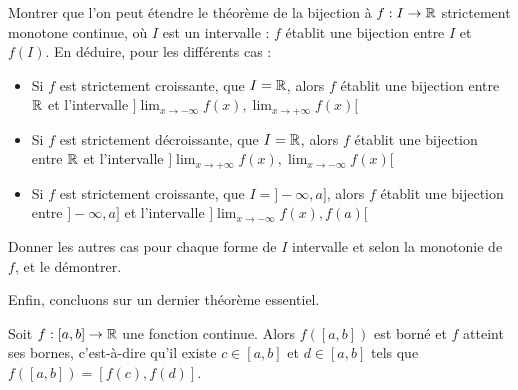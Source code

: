 \begin{exo}
    Montrer que l'on peut étendre le théorème de la bijection à $f : I \to \mathbb{R}$ strictement monotone continue, où $I$ est un intervalle : $f$ établit une bijection entre $I$ et $f(I)$. En déduire, pour les différents cas :
    \begin{itemize}[label=$\bullet$]
        \item Si $f$ est strictement croissante, que $I = \mathbb{R}$, alors $f$ établit une bijection entre $\mathbb{R}$ et l'intervalle $\displaystyle{\big]\lim_{x\to-\infty} f(x),\lim_{x\to+\infty}f(x)\big[}$
        \item Si $f$ est strictement décroissante, que $I = \mathbb{R}$, alors $f$ établit une bijection entre $\mathbb{R}$ et l'intervalle $\displaystyle{\big]\lim_{x\to+\infty} f(x),\lim_{x\to-\infty}f(x)\big[}$
        \item Si $f$ est strictement croissante, que $I = ]-\infty,a]$, alors $f$ établit une bijection entre $]-\infty,a]$ et l'intervalle $\displaystyle{\big]\lim_{x\to-\infty}f(x),f(a)\big[}$
    \end{itemize}
    Donner les autres cas pour chaque forme de $I$ intervalle et selon la monotonie de $f$, et le démontrer.
\end{exo}

Enfin, concluons sur un dernier théorème essentiel.

\begin{them}
    Soit $f : [a,b] \to\mathbb{R}$ une fonction continue. Alors $f([a,b])$ est borné et $f$ atteint ses bornes, c'est-à-dire qu'il existe $c\in[a,b]$ et $d\in[a,b]$ tels que $f([a,b]) = [f(c),f(d)]$.
\end{them}


